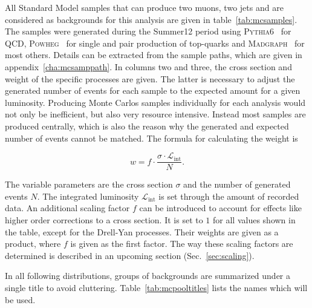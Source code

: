 All Standard Model samples that can produce two muons, two jets and are considered as backgrounds for this analysis are given in table~\ref{tab:mcsamples}. The samples were generated during the Summer12 period using \textsc{Pythia6}~\cite{pythia6} for QCD, \textsc{Powheg}~\cite{powheg,powhegst,powhegtt} for single and pair production of top-quarks and \textsc{Madgraph}~\cite{madgraph5} for most others. Details can be extracted from the sample paths, which are given in appendix~\ref{cha:mcsamppath}. In columns two and three, the cross section and weight of the specific processes are given. The latter is necessary to adjust the generated number of events for each sample to the expected amount for a given luminosity. Producing Monte Carlos samples individually for each analysis would not only be inefficient, but also very resource intensive. Instead most samples are produced centrally, which is also the reason why the generated and expected number of events cannot be matched. The formula for calculating the weight is

\begin{equation}
  \label{eq:weight}
  w = f \cdot \frac{\sigma \cdot \mathcal{L}_{\text{int}}}{N}.
\end{equation}

\noindent The variable parameters are the cross section $\sigma$ and the number of generated events $N$. The integrated luminosity $\mathcal{L}_{\text{int}}$ is set through the amount of recorded data. An additional scaling factor $f$ can be introduced to account for effects like higher order corrections to a cross section. It is set to $1$ for all values shown in the table, except for the Drell-Yan processes. Their weights are given as a product, where $f$ is given as the first factor. The way these scaling factors are determined is described in an upcoming section (Sec.~\ref{sec:scaling}).

In all following distributions, groups of backgrounds are summarized under a single title to avoid cluttering. Table~\ref{tab:mcpooltitles} lists the names which will be used.

